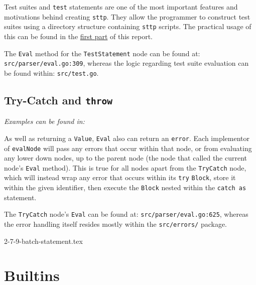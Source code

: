 \documentclass[]{full}
\theoremstyle{definition}
\begin{document}
Test suites and \verb|test| statements are one of the most important features and motivations behind creating \verb|sttp|. They allow the programmer to construct test suites using a directory structure containing \verb|sttp| scripts. The practical usage of this can be found in the \hyperref[sec:hello-sttp-using-sttp-to-test]{first part} of this report.

The \verb|Eval| method for the \verb|TestStatement| node can be found at: \verb|src/parser/eval.go:309|, whereas the logic regarding test suite evaluation can be found within: \verb|src/test.go|.

\cprotect\subsection{Try-Catch and \verb|throw|}

\textit{Examples can be found in: }

As well as returning a \verb|Value|, \verb|Eval| also can return an \texttt{error}. Each implementor of \verb|evalNode| will pass any errors that occur within that node, or from evaluating any lower down nodes, up to the parent node (the node that called the current node's \verb|Eval| method). This is true for all nodes apart from the \verb|TryCatch| node, which will instead wrap any error that occurs within its \verb|try| \verb|Block|, store it within the given identifier, then execute the \verb|Block| nested within the \verb|catch as| statement.

The \verb|TryCatch| node's \verb|Eval| can be found at: \verb|src/parser/eval.go:625|, whereas the error handling itself resides mostly within the \verb|src/errors/| package.

{2-7-9-batch-statement.tex}

\section{Builtins}
\label{sec:development-builtins}
\end{document}
